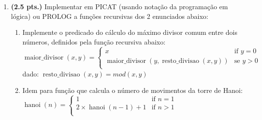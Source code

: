 \documentclass[a4paper,11pt]{article}
\begin{document}
\begin{enumerate}
\item {\bf (2.5 pts.)} Implementar em PICAT (usando notação da programação em lógica) ou PROLOG  a funções recursivas dos 2 enunciados abaixo:
\begin{enumerate}
   \item Implemente o predicado do cálculo do máximo divisor comum entre dois números, definidos pela função recursiva abaixo:\\
  $ \operatorname{maior\_divisor}(x,y) =
  \begin{cases}
 x & \mbox{if } y = 0 \\
\operatorname{maior\_divisor}(y, \operatorname{resto\_divisao}(x,y)) & \mbox{se } y > 0 \\
 \end{cases}
$\\
dado: $\operatorname{resto\_divisao}(x,y) = mod(x,y)$

\item Idem para função que calcula o número de movimentos da torre de Hanoi:\\
$
\operatorname{hanoi}(n) =
 \begin{cases}
 1 & \mbox{if } n = 1 \\
 2\times\operatorname{hanoi}(n-1) + 1 & \mbox{if } n > 1\\
 \end{cases}
$ 
 
\end{enumerate}

\end{enumerate}

\begin{comment}
  \item  Algo como ....:
  $$ 
  \operatorname{fact}(n) =
 \begin{cases}
  1 & \mbox{if } n = 0 \\
  n \cdot \operatorname{fact}(n-1) & \mbox{se } n > 0 \\
 \end{cases}
$$
   \end{comment}
\end{document}
